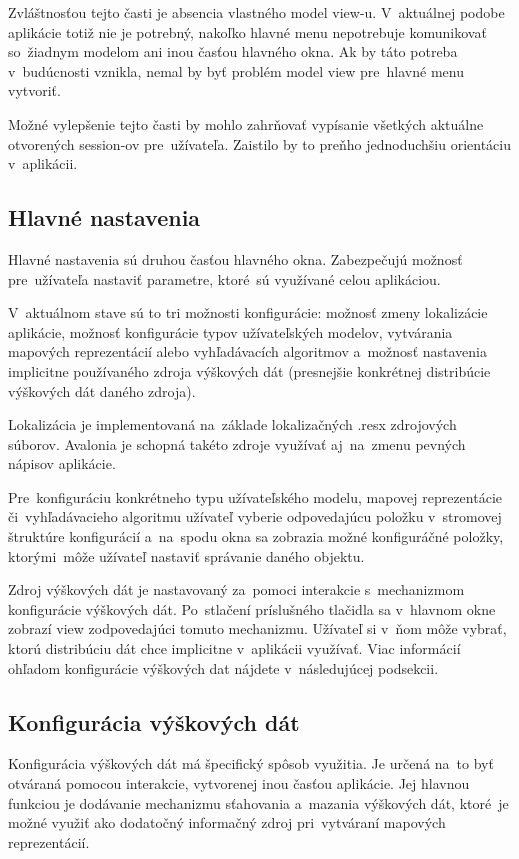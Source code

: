 Zvláštnosťou tejto časti je absencia vlastného model view-u. V~aktuálnej podobe aplikácie totiž nie je potrebný, nakoľko hlavné menu nepotrebuje komunikovať so~žiadnym modelom ani inou časťou hlavného okna. Ak by táto potreba v~budúcnosti vznikla, nemal by byť problém model view pre~hlavné menu vytvoriť. 

Možné vylepšenie tejto časti by mohlo zahrňovať vypísanie všetkých aktuálne otvorených session-ov pre~užívateľa. Zaistilo by to preňho jednoduchšiu orientáciu v~aplikácii.

\subsection{Hlavné nastavenia}

Hlavné nastavenia sú druhou časťou hlavného okna. Zabezpečujú možnosť pre~užívateľa nastaviť parametre, ktoré~sú využívané celou aplikáciou. 

V~aktuálnom stave sú to tri možnosti konfigurácie: možnosť zmeny lokalizácie aplikácie, možnosť konfigurácie typov užívateľských modelov, vytvárania mapových reprezentácií alebo vyhľadávacích algoritmov a~možnosť nastavenia implicitne používaného zdroja výškových dát (presnejšie konkrétnej distribúcie výškových dát daného zdroja). 

Lokalizácia je implementovaná na~základe lokalizačných .resx zdrojových súborov. Avalonia je schopná takéto zdroje využívať aj~na~zmenu pevných nápisov aplikácie.

Pre~konfiguráciu konkrétneho typu užívateľského modelu, mapovej reprezentácie či~vyhľadávacieho algoritmu užívateľ vyberie odpovedajúcu položku v~stromovej štruktúre konfigurácií a~na~spodu okna sa zobrazia možné konfiguráčné položky, ktorými~môže užívateľ nastaviť správanie daného objektu.

Zdroj výškových dát je nastavovaný za~pomoci interakcie s~mechanizmom konfigurácie výškových dát. Po~stlačení príslušného tlačidla sa v~hlavnom okne zobrazí view zodpovedajúci tomuto mechanizmu. Užívateľ si v~ňom môže vybrať, ktorú distribúciu dát chce implicitne v~aplikácii využívať. Viac informácií ohľadom konfigurácie výškových dat nájdete v~následujúcej podsekcii.

\subsection{Konfigurácia výškových dát}\label{konfiguracia_vyskovych_dat}

Konfigurácia výškových dát má špecifický spôsob využitia. Je určená na~to byť otváraná pomocou interakcie, vytvorenej inou časťou aplikácie. Jej hlavnou funkciou je dodávanie mechanizmu sťahovania a~mazania výškových dát, ktoré~je možné využiť ako dodatočný informačný zdroj pri~vytváraní mapových reprezentácií. 

